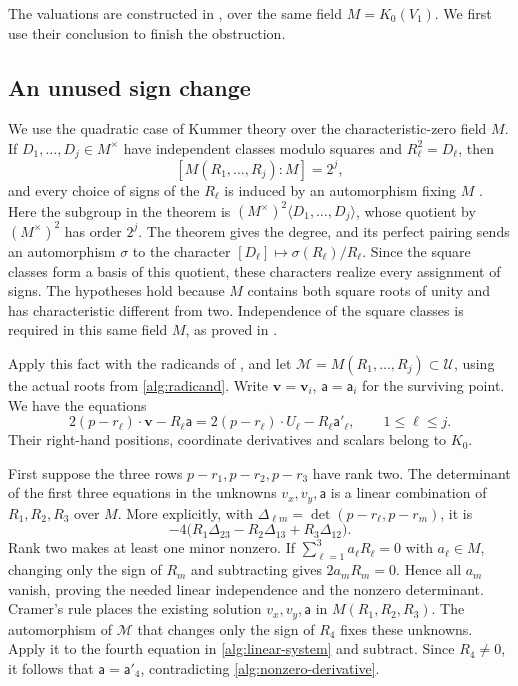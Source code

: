 The valuations are constructed in , over
the same field \(M=K_0(V_1)\). We first use their conclusion to
finish the obstruction.

\subsection{An unused sign change}\label{sec:sign-change}

We use the quadratic case of Kummer theory over the characteristic-zero
field \(M\). If \(D_1,\ldots,D_j\in M^\times\) have independent
classes modulo squares and \(R_\ell^2=D_\ell\), then
\[
 [M(R_1,\ldots,R_j):M]=2^j,
\]
and every choice of signs of the \(R_\ell\) is induced by an
automorphism fixing \(M\)
\cite[Theorem~5.30 and Remark~5.32]{milneFields}.
Here the subgroup in the theorem is
\((M^\times)^2\langle D_1,\ldots,D_j\rangle\), whose quotient by
\((M^\times)^2\) has order \(2^j\). The theorem gives the degree,
and its perfect pairing sends an automorphism \(\sigma\) to the
character \([D_\ell]\mapsto\sigma(R_\ell)/R_\ell\).
Since the square classes form a basis of this quotient, these
characters realize every assignment of signs.
The hypotheses hold because \(M\) contains both square roots of unity
and has characteristic different from two. Independence of the
square classes is required in this same field \(M\), as proved in
.

Apply this fact with the radicands of
, and let
\(\mathcal M=M(R_1,\ldots,R_j)\subset\mathcal U\), using the
actual roots from \eqref{alg:radicand}. Write \(\mathbf v=\mathbf v_i\), \(\mathsf a=\mathsf a_i\)
for the surviving point. We have the equations
\begin{equation}\label{alg:linear-system}
 2(p-r_\ell)\cdot \mathbf v-R_\ell \mathsf a
   =2(p-r_\ell)\cdot U_\ell-R_\ell \mathsf a'_\ell,
 \qquad 1\le\ell\le j.
\end{equation}
Their right-hand positions, coordinate derivatives and scalars belong to \(K_0\).

First suppose the three rows \(p-r_1,p-r_2,p-r_3\) have rank two.
The determinant of the first three equations in the unknowns
\(v_x,v_y,\mathsf a\) is a linear combination of \(R_1,R_2,R_3\) over
\(M\). More explicitly, with
\(\Delta_{\ell m}=\det(p-r_\ell,p-r_m)\), it is
\[
 -4\bigl(R_1\Delta_{23}-R_2\Delta_{13}+R_3\Delta_{12}\bigr).
\]
Rank two makes at least one minor nonzero. If
\(\sum_{\ell=1}^3 a_\ell R_\ell=0\) with \(a_\ell\in M\),
changing only the sign of \(R_m\) and subtracting gives
\(2a_mR_m=0\). Hence all \(a_m\) vanish, proving the needed
linear independence and the nonzero determinant. Cramer's rule places
the existing solution \(v_x,v_y,\mathsf a\) in \(M(R_1,R_2,R_3)\).
The automorphism of \(\mathcal M\) that changes only the sign of
\(R_4\) fixes these unknowns. Apply it to the fourth equation in
\eqref{alg:linear-system} and subtract. Since \(R_4\ne0\), it
follows that \(\mathsf a=\mathsf a'_4\), contradicting
\eqref{alg:nonzero-derivative}.

